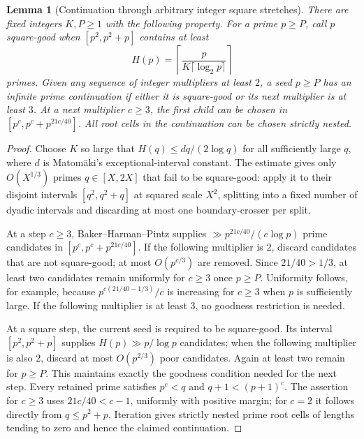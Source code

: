 \documentclass[11pt,a4paper]{article}
\newtheorem{lemma}[theorem]{Lemma}
\theoremstyle{definition}
\theoremstyle{remark}
\numberwithin{equation}{section}
\begin{document}
\begin{lemma}[Continuation through arbitrary integer square stretches]
\label{f13:bdsup:continuation}
There are fixed integers $K,P\ge1$ with the following property. For a
prime $p\ge P$, call $p$ square-good when $[p^2,p^2+p]$ contains at least
\[
 H(p)=\left\lceil\frac{p}{K\lceil\log_2p\rceil}\right\rceil
\]
primes. Given any sequence of integer multipliers at least $2$, a seed
$p\ge P$ has an infinite prime continuation if either it is square-good
or its next multiplier is at least $3$. At a next multiplier $c\ge3$,
the first child can be chosen in
$[p^c,p^c+p^{21c/40}]$. All root cells in the continuation can be chosen
strictly nested.
\end{lemma}
\begin{proof}
Choose $K$ so large that $H(q)\le dq/(2\log q)$ for all sufficiently
large $q$, where $d$ is Matom\"aki's exceptional-interval constant.
The estimate gives only $O(X^{1/3})$ primes $q\in[X,2X]$ that fail to
be square-good: apply it to their disjoint intervals
$[q^2,q^2+q]$ at squared scale $X^2$, splitting into a fixed number of
dyadic intervals and discarding at most one boundary-crosser per split.

At a step $c\ge3$, Baker--Harman--Pintz \cite{BHP} supplies
$\gg p^{21c/40}/(c\log p)$ prime candidates in
$[p^c,p^c+p^{21c/40}]$. If the following multiplier is $2$, discard
candidates that are not square-good; at most $O(p^{c/3})$ are removed.
Since $21/40>1/3$, at least two candidates remain uniformly for $c\ge3$
once $p\ge P$. Uniformity follows, for example, because
$p^{c(21/40-1/3)}/c$ is increasing for $c\ge3$ when $p$ is sufficiently
large. If the following multiplier is at least $3$, no goodness
restriction is needed.

At a square step, the current seed is required to be square-good.
Its interval $[p^2,p^2+p]$ supplies $H(p)\gg p/\log p$ candidates;
when the following multiplier is also $2$, discard at most
$O(p^{2/3})$ poor candidates. Again at least two remain for $p\ge P$.
This maintains exactly the goodness condition needed for the next step.
Every retained prime satisfies $p^c<q$ and $q+1<(p+1)^c$.
The assertion for $c\ge3$ uses $21c/40<c-1$, uniformly with positive
margin; for $c=2$ it follows directly from $q\le p^2+p$.
Iteration gives strictly nested prime root cells of lengths tending
to zero and hence the claimed continuation.
\end{proof}
\end{document}
